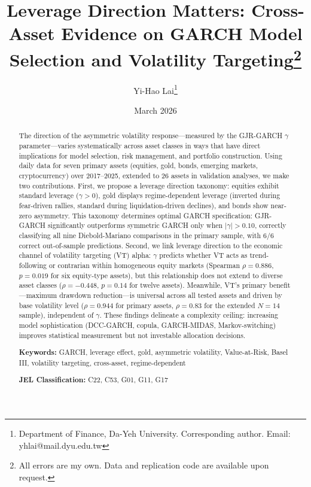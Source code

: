 \documentclass[12pt,a4paper]{article}
\title{Leverage Direction Matters: Cross-Asset Evidence on GARCH Model Selection and Volatility Targeting\thanks{All errors are my own. Data and replication code are available upon request.}}
\author{Yi-Hao Lai\thanks{Department of Finance, Da-Yeh University. Corresponding author. Email: yhlai@mail.dyu.edu.tw}}
\date{March 2026}
\begin{document}
\maketitle

\begin{abstract}
\noindent
The direction of the asymmetric volatility response---measured by the GJR-GARCH $\gamma$ parameter---varies systematically across asset classes in ways that have direct implications for model selection, risk management, and portfolio construction. Using daily data for seven primary assets (equities, gold, bonds, emerging markets, cryptocurrency) over 2017--2025, extended to 26 assets in validation analyses, we make two contributions. First, we propose a leverage direction taxonomy: equities exhibit standard leverage ($\gamma > 0$), gold displays regime-dependent leverage (inverted during fear-driven rallies, standard during liquidation-driven declines), and bonds show near-zero asymmetry. This taxonomy determines optimal GARCH specification: GJR-GARCH significantly outperforms symmetric GARCH only when $|\gamma| > 0.10$, correctly classifying all nine Diebold-Mariano comparisons in the primary sample, with 6/6 correct out-of-sample predictions. Second, we link leverage direction to the economic channel of volatility targeting (VT) alpha: $\gamma$ predicts whether VT acts as trend-following or contrarian within homogeneous equity markets (Spearman $\rho = 0.886$, $p = 0.019$ for six equity-type assets), but this relationship does not extend to diverse asset classes ($\rho = -0.448$, $p = 0.14$ for twelve assets). Meanwhile, VT's primary benefit---maximum drawdown reduction---is universal across all tested assets and driven by base volatility level ($\rho = 0.944$ for primary assets, $\rho = 0.83$ for the extended $N = 14$ sample), independent of $\gamma$. These findings delineate a complexity ceiling: increasing model sophistication (DCC-GARCH, copula, GARCH-MIDAS, Markov-switching) improves statistical measurement but not investable allocation decisions.

\medskip
\noindent
\textbf{Keywords:} GARCH, leverage effect, gold, asymmetric volatility, Value-at-Risk, Basel III, volatility targeting, cross-asset, regime-dependent

\medskip
\noindent
\textbf{JEL Classification:} C22, C53, G01, G11, G17
\end{abstract}
\end{document}
